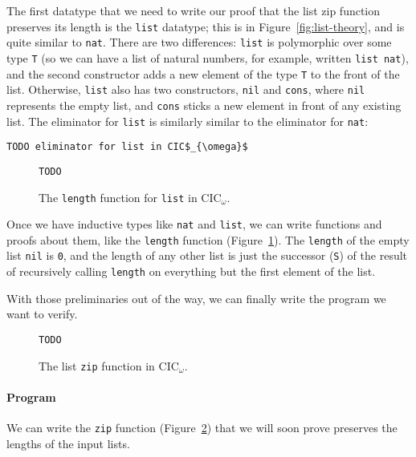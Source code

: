 The first datatype that we need to write our proof that the list zip function preserves its length is the \lstinline{list} datatype;
this is in Figure~\ref{fig:list-theory}, and is quite similar to \lstinline{nat}.
There are two differences: \lstinline{list} is polymorphic over some type \lstinline{T} (so we can have a list of natural numbers,
for example, written \lstinline{list nat}), and the second constructor adds a new element of the type \lstinline{T} to the front of the list.
Otherwise, \lstinline{list} also has two constructors, \lstinline{nil} and \lstinline{cons}, where \lstinline{nil} represents the empty list,
and \lstinline{cons} sticks a new element in front of any existing list.
The eliminator for \lstinline{list} is similarly similar to the eliminator for \lstinline{nat}:

\begin{lstlisting}
TODO eliminator for list in CIC$_{\omega}$
\end{lstlisting}

\begin{figure}
\begin{lstlisting}
TODO
\end{lstlisting}
\caption{The \lstinline{length} function for \lstinline{list} in CIC$_{\omega}$.}
\label{fig:length-theory}
\end{figure}

Once we have inductive types like \lstinline{nat} and \lstinline{list}, we can write functions and proofs about them, like the \lstinline{length} function (Figure~\ref{fig:length-theory}).
The \lstinline{length} of the empty list \lstinline{nil} is \lstinline{0}, and the length of any other list
is just the successor (\lstinline{S}) of the result of recursively calling \lstinline{length} on everything but the first element of the list.

With those preliminaries out of the way, we can finally write the program we want to verify.

\begin{figure}
\begin{lstlisting}
TODO
\end{lstlisting}
\caption{The list \lstinline{zip} function in CIC${_\omega}$.}
\label{fig:zip-theory}
\end{figure}

\paragraph{Program}
We can write the \lstinline{zip} function (Figure~\ref{fig:zip-theory}) that we will soon prove preserves the lengths of the input lists.

